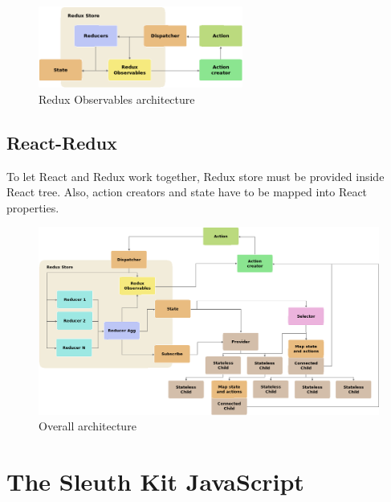 \begin{figure}[htb]
	\begin{center}
		\includegraphics[width=0.6\textwidth]{./figures/redux-observables.png}
		\caption{Redux Observables architecture}
		\label{F:redux-observables-architecture}
	\end{center}
\end{figure}

\subsection{React-Redux}

To let React and Redux work together, Redux store must be provided inside React
tree. Also, action creators and state have to be mapped into React properties.

\begin{landscape}
\begin{figure}[htp]
	\begin{center}
		\includegraphics[width=1.3\textwidth]
		{./figures/overall-architecture.png}

		\caption{Overall architecture}
		\label{F:overall-architecture}
	\end{center}
\end{figure}
\end{landscape}

\section{The Sleuth Kit JavaScript}



